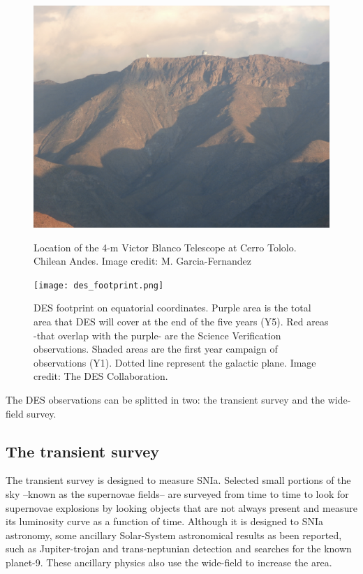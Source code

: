 \begin{figure}
\begin{center}
\includegraphics[width=\textwidth]{./Pictures/cerrotololo_mine.jpg}
\caption{Location of the 4-m Victor Blanco Telescope at Cerro Tololo. Chilean Andes. Image credit: M. Garcia-Fernandez}
\label{fig:cerrotololo}
\vspace{2cm}
\texttt{[image: des\_footprint.png]}
\caption{DES footprint on equatorial coordinates. Purple area is the total area that DES will cover at the end of the five years (Y5). Red areas -that overlap with the purple- are the Science Verification observations. Shaded areas are the first year campaign of observations (Y1). Dotted line represent the galactic plane. Image credit: The DES Collaboration.}
\label{fig:des_footprint}
\end{center}
\end{figure}

The DES observations can be splitted in two: the transient survey and the wide-field survey.

\subsection{The transient survey}
The transient survey is designed to measure SNIa. Selected small portions of the sky --known as the supernovae fields-- are surveyed from time to time to look for supernovae explosions by looking objects that are not always present and measure its luminosity curve as a function of time. Although it is designed to SNIa astronomy, some ancillary Solar-System astronomical results as been reported, such as Jupiter-trojan and trans-neptunian detection and searches for the known planet-9. These ancillary physics also use the wide-field to increase the area.


